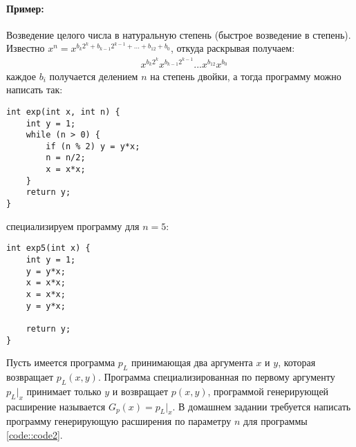 \paragraph{Пример:} Возведение целого числа в натуральную степень (быстрое возведение в степень). Известно $x^n = x^{b_k2^k + b_{k-1}2^{k-1} + ... + b_12 + b_0}$,
откуда раскрывая получаем:
\[
	\begin{split}
		&x^{b_k2^k}x^{b_{k-1}2^{k-1}}...x^{b_12}x^{b_0}
	\end{split}
\]
каждое $b_i$ получается делением $n$ на степень двойки, а тогда программу можно написать так:
\begin{lstlisting}
int exp(int x, int n) {
	int y = 1;
	while (n > 0) {
		if (n % 2) y = y*x;
		n = n/2;
		x = x*x;
	}
	return y;
}
\end{lstlisting}
\label{code::code2}
специализируем программу для $n=5$:
\begin{lstlisting}
int exp5(int x) {
	int y = 1;
	y = y*x;
	x = x*x;
	x = x*x;
	y = y*x;
	
	return y;
}
\end{lstlisting}

Пусть имеется программа $p_L$ принимающая два аргумента $x$ и $y$, которая возвращает $p_L\left(x,y\right)$. Программа специализированная по первому аргументу
$p_L |_x$ принимает только $y$ и возвращает $p\left(x,y\right)$, программой генерирующей расширение называется $G_p\left(x\right) = p_L |_x$. В домашнем задании
требуется написать программу генерирующую расширения по параметру $n$ для программы \ref{code::code2}.